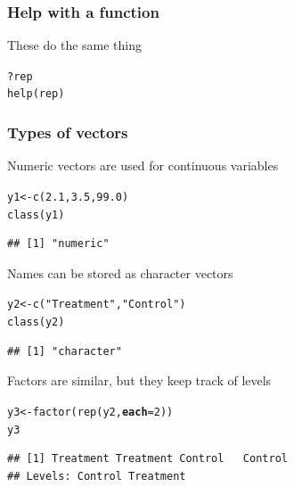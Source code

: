 \documentclass[color=usenames,dvipsnames]{beamer}\usepackage[]{graphicx}\usepackage[]{color}
\makeatletter
\newcommand{\hlnum}[1]{\textcolor[rgb]{0.69,0.494,0}{#1}}%
\newcommand{\hlstr}[1]{\textcolor[rgb]{0.749,0.012,0.012}{#1}}%
\newcommand{\hlopt}[1]{\textcolor[rgb]{0,0,0}{#1}}%
\newcommand{\hlstd}[1]{\textcolor[rgb]{0,0,0}{#1}}%
\newcommand{\hlkwb}[1]{\textcolor[rgb]{0,0.341,0.682}{#1}}%
\newcommand{\hlkwc}[1]{\textcolor[rgb]{0,0,0}{\textbf{#1}}}%
\newcommand{\hlkwd}[1]{\textcolor[rgb]{0.004,0.004,0.506}{#1}}%
\newenvironment{kframe}{%
 \def\at@end@of@kframe{}%
 \ifinner\ifhmode%
  \def\at@end@of@kframe{\end{minipage}}%
  \begin{minipage}{\columnwidth}%
 \fi\fi%
 \def\FrameCommand##1{\hskip\@totalleftmargin \hskip-\fboxsep
 \colorbox{shadecolor}{##1}\hskip-\fboxsep
     \hskip-\linewidth \hskip-\@totalleftmargin \hskip\columnwidth}%
 \MakeFramed {\advance\hsize-\width
   \@totalleftmargin\z@ \linewidth\hsize
   \@setminipage}}%
 {\par\unskip\endMakeFramed%
 \at@end@of@kframe}
\newenvironment{knitrout}{}{} %
\makeatother
\begin{document}
\begin{frame}[fragile]
  \frametitle{Help with a function}
\LARGE
These do the same thing
\begin{knitrout}
\color{fgcolor}\begin{kframe}
\begin{alltt}
\hlopt{?}\hlstd{rep}
\hlkwd{help}\hlstd{(rep)}
\end{alltt}
\end{kframe}
\end{knitrout}
\end{frame}




\begin{frame}[fragile]
  \frametitle{Types of vectors}
  Numeric vectors are used for continuous variables
\begin{knitrout}\small
{}\color{fgcolor}\begin{kframe}
\begin{alltt}
\hlstd{y1} \hlkwb{<-} \hlkwd{c}\hlstd{(}\hlnum{2.1}\hlstd{,} \hlnum{3.5}\hlstd{,} \hlnum{99.0}\hlstd{)}
\hlkwd{class}\hlstd{(y1)}
\end{alltt}
\begin{verbatim}
## [1] "numeric"
\end{verbatim}
\end{kframe}
\end{knitrout}
\pause \vfill
  Names can be stored as character vectors
\begin{knitrout}\small
{}\color{fgcolor}\begin{kframe}
\begin{alltt}
\hlstd{y2} \hlkwb{<-} \hlkwd{c}\hlstd{(}\hlstr{"Treatment"}\hlstd{,} \hlstr{"Control"}\hlstd{)}
\hlkwd{class}\hlstd{(y2)}
\end{alltt}
\begin{verbatim}
## [1] "character"
\end{verbatim}
\end{kframe}
\end{knitrout}
\pause \vfill
Factors are similar, but they keep track of levels
\begin{knitrout}\small
{}\color{fgcolor}\begin{kframe}
\begin{alltt}
\hlstd{y3} \hlkwb{<-} \hlkwd{factor}\hlstd{(}\hlkwd{rep}\hlstd{(y2,} \hlkwc{each}\hlstd{=}\hlnum{2}\hlstd{))}
\hlstd{y3}
\end{alltt}
\begin{verbatim}
## [1] Treatment Treatment Control   Control  
## Levels: Control Treatment
\end{verbatim}
\end{kframe}
\end{knitrout}
\end{frame}
\end{document}
